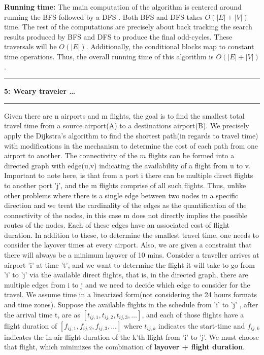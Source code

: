 \documentclass{article}
\newcommand\question[2]{\vspace{.25in}\hrule\textbf{#1: #2}\hrule\vspace{.10in}}
\newcommand\runtime{\vspace{.10in}\textbf{Running time: }}
\begin{document}
\runtime 
   The main computation of the algorithm is centered around running the BFS followed by a DFS .  Both BFS and DFS takes $O(|E| + |V|)$ time. The rest of the computations are precisely about back tracking the search results produced by BFS and DFS to produce the final odd-cycles. These traversals will be $O(|E|)$. Additionally, the conditional blocks map to constant time operations. Thus, the overall running time of this algorithm is $O(|E| + |V|)$. \newline


\question{5}{Weary traveler \dots}
  Given there are n airports and m flights, the goal is to find the smallest total travel time from a source airport(A) to a destinations airport(B). \newline
We precisely apply the Dijkstra's algorithm to find the shortest path(in regards to travel time) with modifications in the mechanism to determine the cost of each path from one airport to another. The connectivity of the $m$ flights can be formed into a directed graph with edge(u,v) indicating the availability of a flight from u to v. Important to note here, is that from a port i there can be multiple direct flights to  another port 'j', and the m flights comprise of all such flights. Thus, unlike other problems where there is a single edge between two nodes in a specific direction and we treat the cardinality of the edges as the quantification of the connectivity of the nodes, in this case m does not directly implies the possible routes of the nodes. Each of these edges have an associated cost of flight duration. \newline
In addition to these, to determine the smallest travel time, one needs to consider the layover times at every airport. Also, we are given a constraint that there will always be a minimum layover of 10 mins. \newline
Consider a traveller arrives at airport 'i' at time 't', and we want to determine the flight it will take to go from 'i' to 'j' via the available direct flights, that is, in the directed graph, there are multiple edges from i to j and we need to decide which edge to consider for the travel. We assume time in a linearized form(not considering the 24 hours formats and time zones). Suppose the available flights in the schedule from 'i' to 'j' , after the arrival time t, are as $[t_{ij,1}, t_{ij,2}, t_{ij,3}, \dots]$, and each of those flights have a flight duration of $[f_{ij,1}, f_{ij,2}, f_{ij,3}, \dots]$ where $t_{ij,k}$ indicates the start-time and $f_{ij,k}$ indicates the in-air flight duration of the k'th flight from 'i' to 'j'. We must choose that flight, which minimizes the combination of \textbf {layover + flight duration}. \newline
\end{document}
